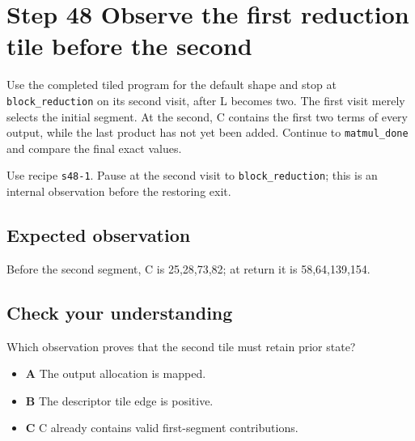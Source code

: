 \section{Step 48 Observe the first reduction tile before the second}\label{matmul-s48}

Use the completed tiled program for the default shape and stop at \texttt{block\_reduction} on its second visit, after L becomes two. The first visit merely selects the initial segment. At the second, C contains the first two terms of every output, while the last product has not yet been added. Continue to \texttt{matmul\_done} and compare the final exact values.

Use recipe \texttt{s48-1}. Pause at the second visit to \texttt{block\_reduction}; this is an internal observation before the restoring exit.

\subsection{Expected observation}
Before the second segment, C is 25,28,73,82; at return it is 58,64,139,154.

\subsection{Check your understanding}
Which observation proves that the second tile must retain prior state?

\begin{itemize}
  \item \textbf{A} The output allocation is mapped.
  \item \textbf{B} The descriptor tile edge is positive.
  \item \textbf{C} C already contains valid first-segment contributions.
\end{itemize}
